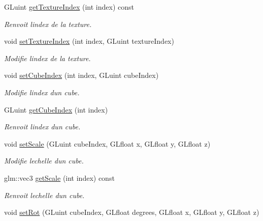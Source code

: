 \begin{DoxyCompactItemize}
G\+Luint \hyperlink{classglimac_1_1CubeList_a28de6776acfb7c76425c145e0b92c55f}{get\+Texture\+Index} (int index) const
\begin{DoxyCompactList}\small\item\em Renvoit l\textquotesingle{}index de la texture. \end{DoxyCompactList}\item 
void \hyperlink{classglimac_1_1CubeList_ae016eb0b09350a67129d265aad1ba62e}{set\+Texture\+Index} (int index, G\+Luint texture\+Index)
\begin{DoxyCompactList}\small\item\em Modifie l\textquotesingle{}index de la texture. \end{DoxyCompactList}\item 
void \hyperlink{classglimac_1_1CubeList_a6c10e49604014aa116a315aacbe6c850}{set\+Cube\+Index} (int index, G\+Luint cube\+Index)
\begin{DoxyCompactList}\small\item\em Modifie l\textquotesingle{}index d\textquotesingle{}un cube. \end{DoxyCompactList}\item 
G\+Luint \hyperlink{classglimac_1_1CubeList_a478146f5afac2969a3ad1ac698f82233}{get\+Cube\+Index} (int index)
\begin{DoxyCompactList}\small\item\em Renvoit l\textquotesingle{}index d\textquotesingle{}un cube. \end{DoxyCompactList}\item 
void \hyperlink{classglimac_1_1CubeList_ab17bd322f6e0cdbd47dcbd223d1d8a64}{set\+Scale} (G\+Luint cube\+Index, G\+Lfloat x, G\+Lfloat y, G\+Lfloat z)
\begin{DoxyCompactList}\small\item\em Modifie l\textquotesingle{}echelle d\textquotesingle{}un cube. \end{DoxyCompactList}\item 
glm\+::vec3 \hyperlink{classglimac_1_1CubeList_ad1e51727e80954e56986173ad9092eb5}{get\+Scale} (int index) const
\begin{DoxyCompactList}\small\item\em Renvoit l\textquotesingle{}echelle d\textquotesingle{}un cube. \end{DoxyCompactList}\item 
void \hyperlink{classglimac_1_1CubeList_a5467702fb89dddbe2de895f8084e6bf3}{set\+Rot} (G\+Luint cube\+Index, G\+Lfloat degrees, G\+Lfloat x, G\+Lfloat y, G\+Lfloat z)

\end{DoxyCompactItemize}
